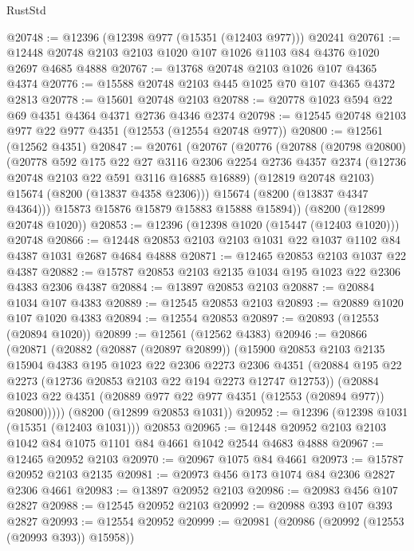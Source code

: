 \begin{lexlean}{RustStd}
\begin{coremodule}
@20748 := @12396 (@12398 @977 (@15351 (@12403 @977))) @20241
@20761 := @12448 @20748 @2103 @2103 @1020 @107 @1026 @1103 @84 @4376 @1020 @2697 @4685 @4888
@20767 := @13768 @20748 @2103 @1026 @107 @4365 @4374
@20776 := @15588 @20748 @2103 @445 @1025 @70 @107 @4365 @4372 @2813
@20778 := @15601 @20748 @2103
@20788 := @20778 @1023 @594 @22 @69 @4351 @4364 @4371 @2736 @4346 @2374
@20798 := @12545 @20748 @2103 @977 @22 @977 @4351 (@12553 (@12554 @20748 @977))
@20800 := @12561 (@12562 @4351)
@20847 := @20761
    (@20767
      (@20776
        (@20788
          (@20798 @20800)
          (@20778
            @592
            @175
            @22
            @27
            @3116
            @2306
            @2254
            @2736
            @4357
            @2374
            (@12736 @20748 @2103 @22 @591 @3116 @16885 @16889)
            (@12819 @20748 @2103)
            @15674
            (@8200 (@13837 @4358 @2306)))
          @15674
          (@8200 (@13837 @4347 @4364)))
        @15873
        @15876
        @15879
        @15883
        @15888
        @15894))
    (@8200 (@12899 @20748 @1020))
@20853 := @12396 (@12398 @1020 (@15447 (@12403 @1020))) @20748
@20866 := @12448 @20853 @2103 @2103 @1031 @22 @1037 @1102 @84 @4387 @1031 @2687 @4684 @4888
@20871 := @12465 @20853 @2103 @1037 @22 @4387
@20882 := @15787 @20853 @2103 @2135 @1034 @195 @1023 @22 @2306 @4383 @2306 @4387
@20884 := @13897 @20853 @2103
@20887 := @20884 @1034 @107 @4383
@20889 := @12545 @20853 @2103
@20893 := @20889 @1020 @107 @1020 @4383
@20894 := @12554 @20853
@20897 := @20893 (@12553 (@20894 @1020))
@20899 := @12561 (@12562 @4383)
@20946 := @20866
    (@20871
      (@20882
        (@20887 (@20897 @20899))
        (@15900
          @20853
          @2103
          @2135
          @15904
          @4383
          @195
          @1023
          @22
          @2306
          @2273
          @2306
          @4351
          (@20884 @195 @22 @2273 (@12736 @20853 @2103 @22 @194 @2273 @12747 @12753))
          (@20884 @1023 @22 @4351 (@20889 @977 @22 @977 @4351 (@12553 (@20894 @977)) @20800)))))
    (@8200 (@12899 @20853 @1031))
@20952 := @12396 (@12398 @1031 (@15351 (@12403 @1031))) @20853
@20965 := @12448 @20952 @2103 @2103 @1042 @84 @1075 @1101 @84 @4661 @1042 @2544 @4683 @4888
@20967 := @12465 @20952 @2103
@20970 := @20967 @1075 @84 @4661
@20973 := @15787 @20952 @2103 @2135
@20981 := @20973 @456 @173 @1074 @84 @2306 @2827 @2306 @4661
@20983 := @13897 @20952 @2103
@20986 := @20983 @456 @107 @2827
@20988 := @12545 @20952 @2103
@20992 := @20988 @393 @107 @393 @2827
@20993 := @12554 @20952
@20999 := @20981 (@20986 (@20992 (@12553 (@20993 @393)) @15958))

\end{coremodule}
\end{lexlean}
